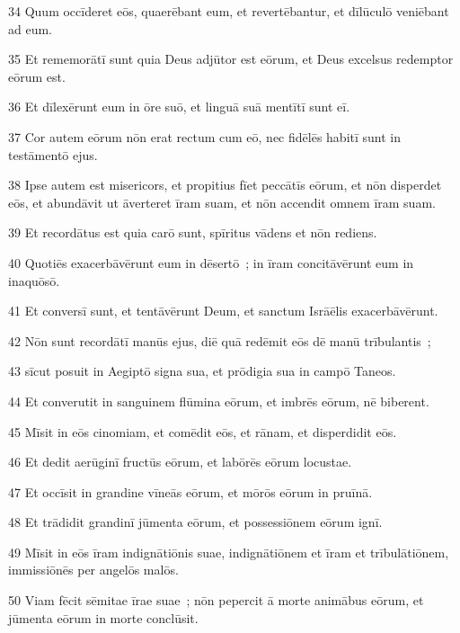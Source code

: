 \psalmVerse
  {\phantom{0}34}
  {Quum occīderet eōs, quaerēbant eum, et revertēbantur, et dīlūculō veniēbant ad eum.}


\psalmVerse
  {\phantom{0}35}
  {Et rememorātī sunt quia Deus adjūtor est eōrum, et Deus excelsus redemptor eōrum est.}


\psalmVerse
  {\phantom{0}36}
  {Et dīlexērunt eum in ōre suō, et linguā suā mentītī sunt eī.}


\psalmVerse
  {\phantom{0}37}
  {Cor autem eōrum nōn erat rectum cum eō, nec fidēlēs habitī sunt in testāmentō ejus.}


\psalmVerse
  {\phantom{0}38}
  {Ipse autem est misericors, et propitius fīet peccātīs eōrum, et nōn disperdet eōs, et abundāvit ut āverteret īram suam, et nōn accendit omnem īram suam.}


\psalmVerse
  {\phantom{0}39}
  {Et recordātus est quia carō sunt, spīritus vādens et nōn rediens.}


\psalmVerse
  {\phantom{0}40}
  {Quotiēs exacerbāvērunt eum in dēsertō~; in īram concitāvērunt eum in inaquōsō.}


\psalmVerse
  {\phantom{0}41}
  {Et conversī sunt, et tentāvērunt Deum, et sanctum Isrāēlis exacerbāvērunt.}


\psalmVerse
  {\phantom{0}42}
  {Nōn sunt recordātī manūs ejus, diē quā redēmit eōs dē manū trībulantis~;}


\psalmVerse
  {\phantom{0}43}
  {sīcut posuit in Aegiptō signa sua, et prōdigia sua in campō Taneos.}


\psalmVerse
  {\phantom{0}44}
  {Et converutit in sanguinem flūmina eōrum, et imbrēs eōrum, nē biberent.}


\psalmVerse
  {\phantom{0}45}
  {Mīsit in eōs cinomiam, et comēdit eōs, et rānam, et disperdidit eōs.}


\psalmVerse
  {\phantom{0}46}
  {Et dedit aerūginī fructūs eōrum, et labōrēs eōrum locustae.}


\psalmVerse
  {\phantom{0}47}
  {Et occīsit in grandine vīneās eōrum, et mōrōs eōrum in pruīnā.}


\psalmVerse
  {\phantom{0}48}
  {Et trādidit grandinī jūmenta eōrum, et possessiōnem eōrum ignī.}


\psalmVerse
  {\phantom{0}49}
  {Mīsit in eōs īram indignātiōnis suae, indignātiōnem et īram et trībulātiōnem, immissiōnēs per angelōs malōs.}


\psalmVerse
  {\phantom{0}50}
  {Viam fēcit sēmitae īrae suae~; nōn pepercit ā morte animābus eōrum, et jūmenta eōrum in morte conclūsit.}


